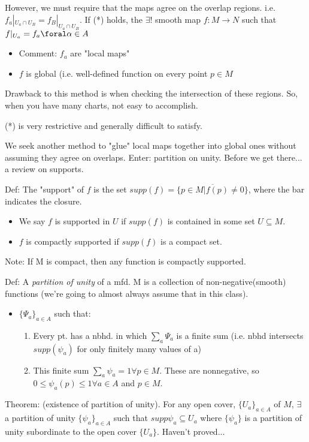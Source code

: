 \documentclass[12pt,letterpaper]{article}
\begin{document}
However, we must require that the maps agree on the overlap regions. i.e. $f_a|_{U_a \cap U_B} = f_B|_{U_a \cap U_B}$. If (*) holds, the $\exists!$ smooth map $f: M \rightarrow N$ such that $f|_{U_a} = f_a \foral \alpha \in A$

\begin{itemize}
    \item Comment: $f_a$ are "local maps"
    \item $f$ is global (i.e. well-defined function on every point $p\in M$
\end{itemize}

Drawback to this method is when checking the intersection of these regions. So, when you have many charts, not easy to accomplish.

(*) is very restrictive and generally difficult to satisfy. 

We seek another method to "glue" local maps together into global ones without assuming they agree on overlaps. Enter: partition on unity. Before we get there... a review on supports.

Def: The "support" of $f$ is the set $supp(f) = \overline{\{ p \in M | f(p) \neq 0 \}}$, where the bar indicates the closure.  
\begin{itemize}
    \item We say $f$ is supported in $U$ if $supp(f)$ is contained in some set $U \subseteq M$. 
    \item $f$ is compactly supported if $supp(f)$ is a compact set.
\end{itemize}
Note: If M is compact, then any function is compactly supported.

Def: A \textit{partition of unity} of a mfd. M is a collection of non-negative(smooth) functions (we're going to almost always assume that in this class).
\begin{itemize}
    \item $\{ \Psi_a\}_{a \in A }$ such that:
    \begin{enumerate}
        \item Every pt. has a nbhd. in which $\sum_a \Psi_a$ is a finite sum (i.e. nbhd intersects $supp(\psi_a)$ for only finitely many values of a)
        \item This finite sum $\sum_a \psi_a = 1 \forall p \in M$. These are nonnegative, so $0 \leq \psi_a(p) \leq 1 \forall a \in A$ and $p \in M$.
    \end{enumerate}
\end{itemize}

Theorem: (existence of partition of unity). For any open cover, $\{ U_a \}_{a \in A}$ of  $M$, $\exists$ a partition of unity $\{ \psi_a \}_{a \in A}$ such that $supp \psi_a  \subseteq U_a$ where $\{\psi_a\} $ is a partition of unity subordinate to the open cover $\{ U_a\}$. Haven't proved...
\end{document}
